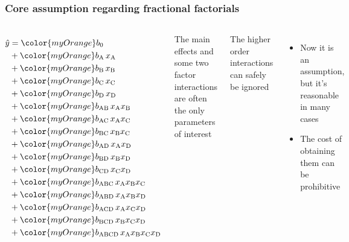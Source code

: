 \begin{frame}\frametitle{Core assumption regarding fractional factorials}
	\begin{columns}
			{\scriptsize
			\begin{align*}
				\hat{y} &= {\color{myOrange}b_0}\\
						&+ {\color{myOrange}b_\text{A}\,}x_\text{A}\\
						&+ {\color{myOrange}b_\text{B}\,}x_\text{B}\\
						&+ {\color{myOrange}b_\text{C}\,}x_\text{C}\\
						&+ {\color{myOrange}b_\text{D}\,}x_\text{D}\\
						&+ {\color{myOrange}b_\text{AB}\,}x_\text{A}x_\text{B}\\
						&+ {\color{myOrange}b_\text{AC}\,}x_\text{A}x_\text{C}\\
						&+ {\color{myOrange}b_\text{BC}\,}x_\text{B}x_\text{C}\\
						&+ {\color{myOrange}b_\text{AD}\,}x_\text{A}x_\text{D}\\
						&+ {\color{myOrange}b_\text{BD}\,}x_\text{B}x_\text{D}\\
						&+ {\color{myOrange}b_\text{CD}\,}x_\text{C}x_\text{D}\\
						&+ {\color{myOrange}b_\text{ABC}\,}x_\text{A}x_\text{B}x_\text{C}\\
						&+ {\color{myOrange}b_\text{ABD}\,}x_\text{A}x_\text{B}x_\text{D}\\
						&+ {\color{myOrange}b_\text{ACD}\,}x_\text{A}x_\text{C}x_\text{D}\\
						&+ {\color{myOrange}b_\text{BCD}\,}x_\text{B}x_\text{C}x_\text{D}\\
						&+ {\color{myOrange}b_\text{ABCD}\,}x_\text{A}x_\text{B}x_\text{C}x_\text{D}
			\end{align*}
			}
			
			\pause
			The main effects and some two factor interactions are often the only parameters of interest
			
			\vspace{36pt}
			The higher order interactions can safely be ignored
			\begin{itemize}
				\item	Now it is an assumption, but it's reasonable in many cases
				\item	The cost of obtaining them can be prohibitive
			\end{itemize}
			
	\end{columns}
\end{frame}

